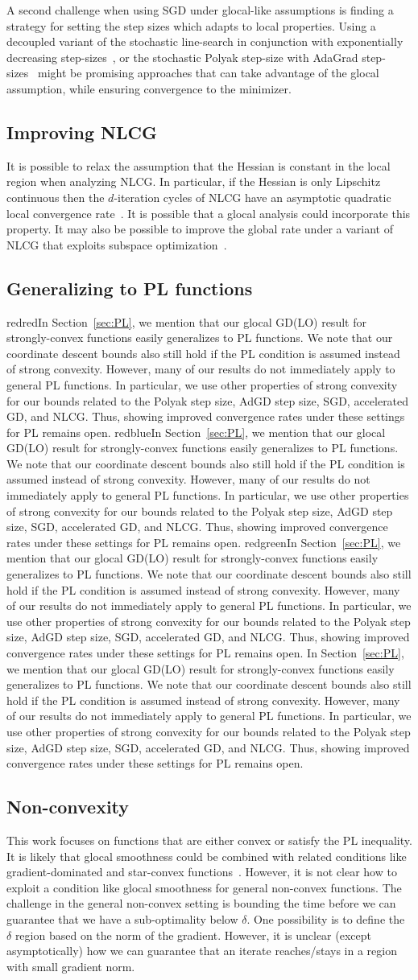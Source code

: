\documentclass[10pt]{article} %
\newif\ifshowcolours
\def\red{red}
\def\blue{blue}
\def\green{green}
\renewcommand{\textcolor}[2]{%
  \ifshowcolours
    {\color{#1}#2}%
  \else
    \def\temp{#1}%
    \ifx\temp\red     #2\else
    \ifx\temp\blue    #2\else
    \ifx\temp\green   #2\else
        {\color{#1}#2}%
    \fi\fi\fi
  \fi
}
\begin{document}
A second challenge when using SGD under glocal-like assumptions is finding a strategy for setting the step sizes which adapts to  local properties. Using a decoupled variant of the stochastic line-search in conjunction with exponentially decreasing step-sizes~\cite{vaswani2022towards}, or the stochastic Polyak step-size with AdaGrad step-sizes~\cite{jiang2024adaptive} might be promising approaches that can take advantage of the glocal assumption, while ensuring convergence to the minimizer.  

\subsection{Improving NLCG}

It is possible to relax the assumption that the Hessian is constant in the local region when analyzing NLCG. In particular, if the Hessian is only Lipschitz continuous then the $d$-iteration cycles of NLCG have an asymptotic quadratic local convergence rate~\cite{polyak1969conjugate}. It is possible that a glocal analysis could incorporate this property. It may also be possible to improve the global rate under a variant of NLCG that exploits subspace optimization~\cite{karimi2017single}.

\subsection{Generalizing to PL functions}


\textcolor{red}{In Section~\ref{sec:PL}, we mention that our glocal GD(LO) result for strongly-convex functions easily generalizes to PL functions. We note that our coordinate descent bounds also still hold if the PL condition is assumed instead of strong convexity. However, many of our results do not immediately apply to general PL functions. In particular, we use other properties of strong convexity for our bounds related to the Polyak step size, AdGD step size, SGD, accelerated GD, and NLCG. Thus, showing improved convergence rates under these settings for PL remains open.}

\subsection{Non-convexity} This work focuses on functions that are either convex or satisfy the PL inequality. 
It is likely that glocal smoothness could be combined with related conditions like gradient-dominated and star-convex functions~\cite{nesterov2006cubic}. However, it is not clear how to exploit a condition like glocal smoothness for general non-convex functions. The challenge in the general non-convex setting is bounding the time before we can guarantee that we have a sub-optimality below $\delta$. One possibility is to define the $\delta$ region based on the norm of the gradient. However, it is unclear (except asymptotically) how we can guarantee that an iterate reaches/stays in a region with small gradient norm.
\end{document}

